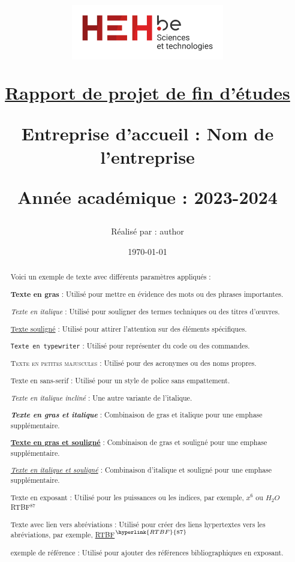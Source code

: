 \documentclass[a4paper, 12pt]{article}
\title{
    \begin{center}
        \includegraphics[width=0.5\textwidth]{img/logo_hehbe_tech.png}
    \end{center}
    \vspace{2cm}
    \begin{center}
        \underline{Rapport de projet de fin d'études}
    \end{center}
    \vspace{2cm}
    \begin{center}
        \fboxrule=0.3mm
        \fbox{
            \parbox{\textwidth}{
                \vspace{1cm}
                \centering
                \textbf{Titre du PFE Lorem ipsum dolor sit amet, consectetur adipiscing elit. Vivamus lacinia odio vitae}
                \vspace{1cm}
            }
        }
    \end{center}
    \vspace{2cm}
    \begin{center}
        \small Entreprise d'accueil : Nom de l'entreprise\\
    \end{center}
    \begin{center}
        \small Année académique : 2023-2024
    \end{center}
    \author{Réalisé par : author}
    \date{\today}

}
\begin{document}
\maketitle
\newpage
\begin{abstract}
    Voici un exemple de texte avec différents paramètres appliqués :
    
    \textbf{Texte en gras} : Utilisé pour mettre en évidence des mots ou des phrases importantes.
    
    \textit{Texte en italique} : Utilisé pour souligner des termes techniques ou des titres d'œuvres.
    
    \underline{Texte souligné} : Utilisé pour attirer l'attention sur des éléments spécifiques.
    
    \texttt{Texte en typewriter} : Utilisé pour représenter du code ou des commandes.
    
    \textsc{Texte en petites majuscules} : Utilisé pour des acronymes ou des noms propres.
    
    \textsf{Texte en sans-serif} : Utilisé pour un style de police sans empattement.
    
    \textsl{Texte en italique incliné} : Une autre variante de l'italique.
    
    \textbf{\textit{Texte en gras et italique}} : Combinaison de gras et italique pour une emphase supplémentaire.
    
    \textbf{\underline{Texte en gras et souligné}} : Combinaison de gras et souligné pour une emphase supplémentaire.
    
    \textit{\underline{Texte en italique et souligné}} : Combinaison d'italique et souligné pour une emphase supplémentaire.
    
    Texte en exposant : Utilisé pour les puissances ou les indices, par exemple, $x^6$ ou $H_2O$ RTBF$^{87}$
    
    Texte avec lien vers abréviations : Utilisé pour créer des liens hypertextes vers les abréviations, par exemple, \hyperlink{RTBF}{RTBF}$^{\hyperlink{RTBF}{87}}$

    exemple de référence\textsuperscript{\cite{ref1}} : Utilisé pour ajouter des références bibliographiques en exposant.
    
\end{abstract}

\newpage
\tableofcontents

\newpage
\newpage

\newpage
\newpage
\end{document}

